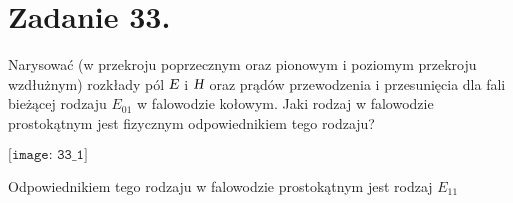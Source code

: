 \section*{Zadanie 33.}
\begin{task}
Narysować (w przekroju poprzecznym oraz pionowym i poziomym przekroju wzdłużnym) rozkłady pól 
$\textsl{E}$ i $\textsl{H}$ oraz prądów przewodzenia i przesunięcia dla fali bieżącej rodzaju $E_{01}$
w falowodzie kołowym. Jaki rodzaj w falowodzie prostokątnym  jest fizycznym odpowiednikiem tego rodzaju?\\
\end{task}

\begin{solution}

\begin{center}
$\texttt{[image: 33\_1]}$\\
\end{center}
Odpowiednikiem tego rodzaju w falowodzie prostokątnym jest rodzaj $E_{11}$\\
\end{solution}

